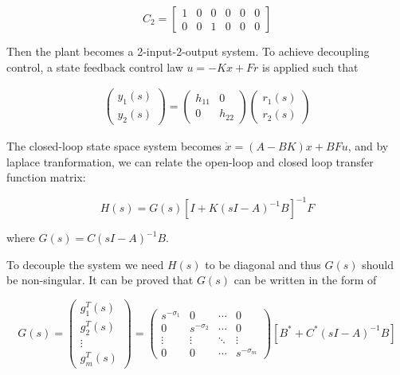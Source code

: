 \documentclass[hyperref]{article}
\theoremstyle{nonumberplain}
\begin{document}
	\begin{equation}
	C_{2}=\begin{bmatrix}
	1 &0  &0  &0  &0  &0 \\ 
	0 &0  &1  &0  &0  &0 
	\end{bmatrix}
	\label{eq35}
	\end{equation}
	
	Then the plant becomes a 2-input-2-output system. To achieve decoupling control, a state feedback control law $u=-Kx+Fr$ is applied such that 
	
	\begin{equation}
	\begin{split}
	\begin{pmatrix}
	y_{1}(s)\\y_{2}(s) 
	\end{pmatrix}=\begin{pmatrix}
	h_{11} &0 \\ 
	0 &h_{22} 
	\end{pmatrix}\begin{pmatrix}
	r_{1}(s)\\ 
	r_{2}(s)
	\end{pmatrix}
	\end{split}
	\label{eq36}
	\end{equation}
	
	The closed-loop state space system becomes $\dot{x}=(A-BK)x+BFu$, and by laplace tranformation, we can relate the open-loop and closed loop transfer function matrix:
	
	\begin{equation}
	H(s)=G(s)[I+K(sI-A)^{-1}B]^{-1}F
	\label{eq37}
	\end{equation}
	
	where $G(s)=C(sI-A)^{-1}B$.
	
	To decouple the system we need $H(s)$ to be diagonal and thus $G(s)$ should be non-singular. It can be proved that $G(s)$ can be written in the form of
	
	\begin{equation}
	G(s)=\begin{pmatrix}
	g_{1}^{T}(s)\\ 
	g_{2}^{T}(s)\\ 
	\vdots \\ 
	g_{m}^{T}(s)
	\end{pmatrix}=\begin{pmatrix}
	s^{-\sigma _{1}} &0  &\cdots   &0 \\ 
	0 &s^{-\sigma _{2}}  &\cdots   &0 \\ 
	\vdots  &\vdots   &\ddots   &\vdots  \\ 
	0 &0  &\cdots   &s^{-\sigma _{m}} 
	\end{pmatrix}[B^{*}+C^{*}(sI-A)^{-1}B]
	\label{eq38}
	\end{equation}
	
\end{document}
